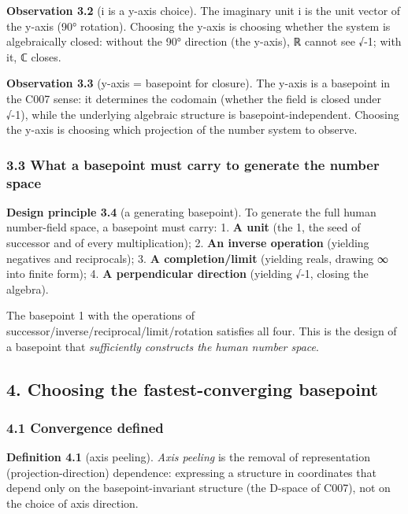 \documentclass[
]{article}
\begin{document}
\textbf{Observation 3.2} (i is a y-axis choice). The imaginary unit i is
the unit vector of the y-axis (90° rotation). Choosing the y-axis is
choosing whether the system is algebraically closed: without the 90°
direction (the y-axis), ℝ cannot see √-1; with it, ℂ closes.

\textbf{Observation 3.3} (y-axis = basepoint for closure). The y-axis is
a basepoint in the C007 sense: it determines the codomain (whether the
field is closed under √-1), while the underlying algebraic structure is
basepoint-independent. Choosing the y-axis is choosing which projection
of the number system to observe.

\subsubsection{3.3 What a basepoint must carry to generate the number
space}\label{what-a-basepoint-must-carry-to-generate-the-number-space}

\textbf{Design principle 3.4} (a generating basepoint). To generate the
full human number-field space, a basepoint must carry: 1. \textbf{A
unit} (the 1, the seed of successor and of every multiplication); 2.
\textbf{An inverse operation} (yielding negatives and reciprocals); 3.
\textbf{A completion/limit} (yielding reals, drawing ∞ into finite
form); 4. \textbf{A perpendicular direction} (yielding √-1, closing the
algebra).

The basepoint 1 with the operations of
successor/inverse/reciprocal/limit/rotation satisfies all four. This is
the design of a basepoint that \emph{sufficiently constructs the human
number space}.

\subsection{4. Choosing the fastest-converging
basepoint}\label{choosing-the-fastest-converging-basepoint}

\subsubsection{4.1 Convergence defined}\label{convergence-defined}

\textbf{Definition 4.1} (axis peeling). \emph{Axis peeling} is the
removal of representation (projection-direction) dependence: expressing
a structure in coordinates that depend only on the basepoint-invariant
structure (the D-space of C007), not on the choice of axis direction.
\end{document}
